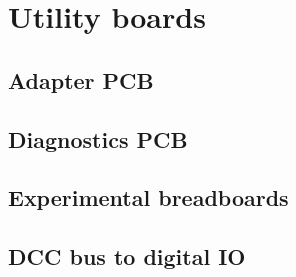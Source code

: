 \chapter{Utility boards}

\section{Adapter PCB}

\section{Diagnostics PCB}

\section{Experimental breadboards}

\section{DCC bus to digital IO}

